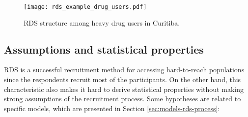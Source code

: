\begin{figure}
  \centering
  \caption{\label{fig:rds-example-drug-users}RDS structure among heavy drug users
  in Curitiba.}
  \texttt{[image: rds\_example\_drug\_users.pdf]}
\end{figure}

\subsection{Assumptions and statistical properties}

RDS is a successful recruitment method for accessing hard-to-reach populations
since the respondents recruit most of the participants. On the other hand,
this characteristic also makes it hard to derive statistical properties
without making strong assumptions of the recruitment process.  Some hypotheses
are related to specific models, which are presented in Section
\ref{sec:models-rds-process}:   

